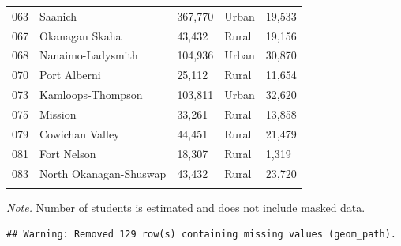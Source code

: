 \documentclass[
  english,
  man]{apa6}
\begin{document}
\begin{table}[tbp]
\begin{center}
\begin{threeparttable}
\begin{tabular}{lllll}
063 & Saanich & 367,770 & Urban & 19,533\\
067 & Okanagan Skaha & 43,432 & Rural & 19,156\\
068 & Nanaimo-Ladysmith & 104,936 & Urban & 30,870\\
070 & Port Alberni & 25,112 & Rural & 11,654\\
073 & Kamloops-Thompson & 103,811 & Urban & 32,620\\
075 & Mission & 33,261 & Rural & 13,858\\
079 & Cowichan Valley & 44,451 & Rural & 21,479\\
081 & Fort Nelson & 18,307 & Rural & 1,319\\
083 & North Okanagan-Shuswap & 43,432 & Rural & 23,720\\
\bottomrule
\addlinespace
\end{tabular}

\begin{tablenotes}[para]
\normalsize{\textit{Note.} Number of students is estimated and does not include masked data.}
\end{tablenotes}

\end{threeparttable}
\end{center}

\end{table}

\begin{verbatim}
## Warning: Removed 129 row(s) containing missing values (geom_path).
\end{verbatim}
\end{document}

